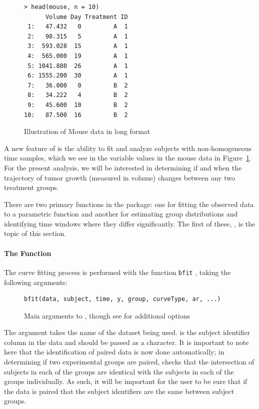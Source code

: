\begin{singlespace}
\begin{figure}[H]
\centering
\begin{BVerbatim}
> head(mouse, n = 10)
      Volume Day Treatment ID
 1:   47.432   0         A  1
 2:   98.315   5         A  1
 3:  593.028  15         A  1
 4:  565.000  19         A  1
 5: 1041.880  26         A  1
 6: 1555.200  30         A  1
 7:   36.000   0         B  2
 8:   34.222   4         B  2
 9:   45.600  10         B  2
10:   87.500  16         B  2
\end{BVerbatim}
\caption{Illustration of Mouse data in long format}
\label{fig:mouse_head}
\end{figure}
\end{singlespace}

A new feature of  is the ability to fit and analyze subjects with non-homogeneous time samples, which we see in the  variable values in the mouse data in Figure~\ref{fig:mouse_head}. For the present analysis, we will be interested in determining if and when the trajectory of tumor growth (measured in volume) changes between any two treatment groups.


There are two primary functions in the  package: one for fitting the observed data to a parametric function and another for estimating group distributions and identifying time windows where they differ significantly. The first of these, , is the topic of this section.


\paragraph{The  Function}

The curve fitting process is performed with the function \texttt{bfit} , taking the following arguments:


\begin{figure}[h!]
\centering
\begin{BVerbatim}
bfit(data, subject, time, y, group, curveType, ar, ...)
\end{BVerbatim}
\caption{Main arguments to , though see  for additional options}
\end{figure}



The  argument takes the name of the dataset being used.  is the subject identifier column in the data and should be passed as a character. It is important to note here that the identification of paired data is now done automatically; in determining if two experimental groups are paired,  checks that the intersection of subjects in each of the groups are identical with the subjects in each of the groups individually. As such, it will be important for the user to be sure that if the data is paired that the subject identifiers are the same between subject groups. 

